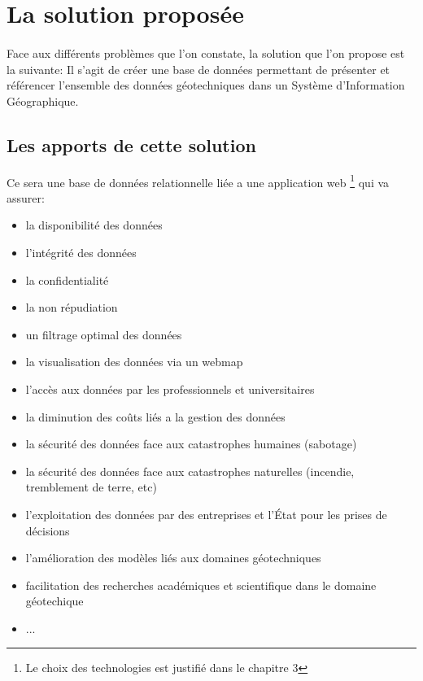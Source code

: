     \section{La solution proposée}
        \paragraph{}
        Face aux différents problèmes que l'on constate, la solution que l'on propose est la suivante:
        Il s'agit de créer une base de données permettant de présenter et référencer l’ensemble des 
        données géotechniques dans un Système d’Information Géographique.
    
        \subsection{Les apports de cette solution}
            Ce sera une base de données relationnelle liée a une application web
            \footnote{Le choix des technologies est justifié dans le chapitre 3} 
            qui va assurer:
            \begin{itemize}
                \item la disponibilité des données
                \item l'intégrité des données
                \item la confidentialité
                \item la non répudiation
                \item un filtrage optimal des données
                \item la visualisation des données via un webmap
                \item l'accès aux données par les professionnels et universitaires
                \item la diminution des coûts liés a la gestion des données
                \item la sécurité des données face aux catastrophes humaines (sabotage)
                \item la sécurité des données face aux catastrophes naturelles (incendie, tremblement de terre, etc)
                \item l'exploitation des données par des entreprises et l'État pour les prises de décisions
                \item l'amélioration des modèles liés aux domaines géotechniques
                \item facilitation des recherches académiques et scientifique dans le domaine géotechique
                \item ...
            \end{itemize}
